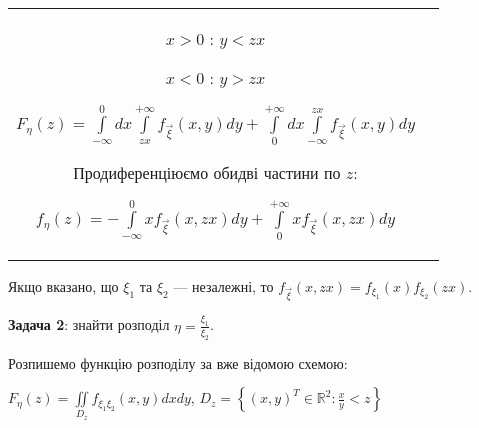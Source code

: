 \begin{enumerate}[label=\Roman*)]
\begin{tabular}{c p{8.8cm}}
    $x > 0$ : $y < zx$
    
    $x < 0$ : $y > zx$

    $F_\eta(z) = \int\limits_{-\infty}^0 dx \int\limits_{zx}^{+\infty}f_{\vec{\xi}}(x, y) dy +
    \int\limits_0^{+\infty}dx\int\limits_{-\infty}^{zx}f_{\vec{\xi}}(x, y)dy $

    Продиференціюємо обидві частини по $z$:

    $f_\eta(z) = -\int\limits_{-\infty}^0 x f_{\vec{\xi}}(x, zx)dy + \int\limits_0^{+\infty}
    xf_{\vec{\xi}}(x, zx)dy$
\end{tabular}
\end{enumerate}

\begin{remark}
    Якщо вказано, що $\xi_1$ та $\xi_2$ --- незалежні, то $f_{\vec{\xi}}(x, zx) = 
    f_{\xi_1}(x)f_{\xi_2}(zx)$.
\end{remark}

\noindent\textbf{Задача 2}: знайти розподіл $\eta = \frac{\xi_1}{\xi_2}$.

Розпишемо функцію розподілу за вже відомою схемою:

$F_\eta(z) = \iint\limits_{D_z}f_{\xi_1\xi_2}(x, y)dxdy$, $D_z = \left\{(x, y)^T \in 
\mathbb{R}^2 : \frac{x}{y} < z\right\}$

